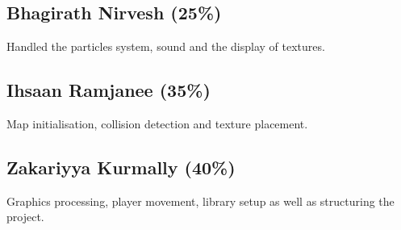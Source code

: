 \documentclass{article}
\begin{document}
\subsection {Bhagirath Nirvesh (25\%)}
Handled the particles system, sound and the display of textures.
\subsection {Ihsaan Ramjanee (35\%)}
Map initialisation, collision detection and texture placement.
\subsection {Zakariyya Kurmally (40\%)}
Graphics processing, player movement, library setup as well as structuring the project.

    
\end{document}
